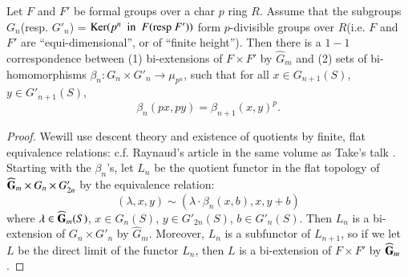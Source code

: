\begin{proposition}\label{art15-prop4}
Let $F$ and $F'$ be formal groups over a {\rm char} $p$ ring $R$. Assume that the subgroups $G_{n}$(resp. $G'_{n}$) = $\operatorname{\mathrm{Ker}} (p^{n}\text{~ in~ } F(\text{resp } F'))$ form $p$-divisible groups over $R$(i.e. $F$ and $F'$ are ``equi-dimensional'', or of ``finite height''). Then there is a $1-1$ correspondence between {\rm(1)} bi-extensions of $F\times F'$ by $\widehat{G}_{m}$ and {\rm(2)} sets of bi-homomorphisms $\beta_{n}:G_{n}\times G'_{n}\to \mu_{p^{n}}$, such that for all $x\in G_{n+1}(S)$, $y\in G'_{n+1}(S)$,
$$
\beta_{n}(px,py)=\beta_{n+1}(x,y)^{p}.
$$
\end{proposition}

\begin{proof}
We\pageoriginale will use descent theory and existence of quotients by finite, flat equivalence relations: c.f. Raynaud's article in the same volume as Take's talk \cite{art15-key6}. Starting with the $\beta_{n}$'s, let $L_{n}$ be the quotient functor in the flat topology of $\widehat{\mathbf{G}}_{m}\times G_{n}\times G'_{2n}$ by the equivalence relation:
$$
(\lambda,x,y)\sim (\lambda\cdot \beta_{n}(x,b),x,y+b)
$$
where $\lambda\in \widehat{\mathbf{G}}_{m}(S)$, $x\in G_{n}(S)$, $y\in G'_{2n}(S)$, $b\in G'_{n}(S)$. Then $L_{n}$ is a bi-extension of $G_{n}\times G'_{n}$ by $\widehat{G}_{m}$. Moreover, $L_{n}$ is a subfunctor of $L_{n+1}$, so if we let $L$ be the direct limit of the functor $L_{n}$, then $L$ is a bi-extension of $F\times F'$ by $\widehat{\mathbf{G}}_{m}$.


\end{proof}
